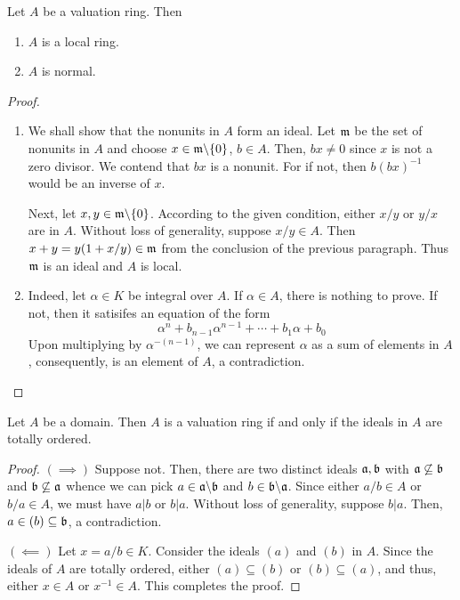 \begin{proposition}
    Let $A$ be a valuation ring. Then 
    \begin{enumerate}[label=(\alph*)]
        \item $A$ is a local ring. 
        \item $A$ is normal.
    \end{enumerate}
\end{proposition}
\begin{proof}
\begin{enumerate}[label=(\alph*)]
    \item We shall show that the nonunits in $A$ form an ideal. Let $\mathfrak m$ be the set of nonunits in $A$ and choose $x\in\mathfrak m\backslash\{0\}$, $b\in A$. Then, $bx\ne 0$ since $x$ is not a zero divisor. We contend that $bx$ is a nonunit. For if not, then $b(bx)^{-1}$ would be an inverse of $x$.

    Next, let $x,y\in\mathfrak m\backslash\{0\}$. According to the given condition, either $x/y$ or $y/x$ are in $A$. Without loss of generality, suppose $x/y\in A$. Then $x + y = y(1 + x/y)\in\mathfrak m$ from the conclusion of the previous paragraph. Thus $\mathfrak m$ is an ideal and $A$ is local.

    \item Indeed, let $\alpha\in K$ be integral over $A$. If $\alpha\in A$, there is nothing to prove. If not, then it satisifes an equation of the form 
    \begin{equation*}
        \alpha^n + b_{n - 1}\alpha^{n - 1} + \cdots + b_1\alpha + b_0
    \end{equation*}
    Upon multiplying by $\alpha^{-(n - 1)}$, we can represent $\alpha$ as a sum of elements in $A$, consequently, is an element of $A$, a contradiction.\qedhere
\end{enumerate}
\end{proof}

\begin{proposition}
    Let $A$ be a domain. Then $A$ is a valuation ring if and only if the ideals in $A$ are totally ordered.
\end{proposition}
\begin{proof}
    $(\implies)$ Suppose not. Then, there are two distinct ideals $\mathfrak a,\mathfrak b$ with $\mathfrak a\not\subseteq\mathfrak b$ and $\mathfrak b\not\subseteq\mathfrak a$ whence we can pick $a\in\mathfrak a\backslash\mathfrak b$ and $b\in\mathfrak b\backslash\mathfrak a$. Since either $a/b\in A$ or $b/a\in A$, we must have $a|b$ or $b|a$. Without loss of generality, suppose $b|a$. Then, $a\in(b)\subseteq\mathfrak b$, a contradiction. 

    $(\impliedby)$ Let $x = a/b\in K$. Consider the ideals $(a)$ and $(b)$ in $A$. Since the ideals of $A$ are totally ordered, either $(a)\subseteq (b)$ or $(b)\subseteq (a)$, and thus, either $x\in A$ or $x^{-1}\in A$. This completes the proof.
\end{proof}


